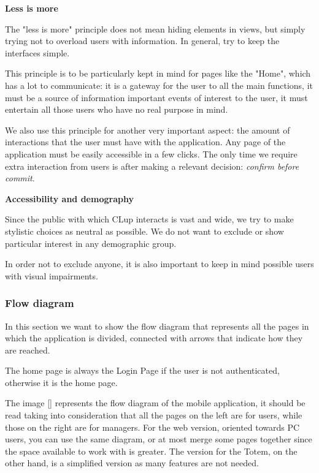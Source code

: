 \noindent
\textbf{Less is more}

The "less is more" principle does not mean hiding elements in views, but simply trying not to overload users with information. In general, try to keep the interfaces simple.

This principle is to be particularly kept in mind for pages like the "Home", which has a lot to communicate: it is a gateway for the user to all the main functions, it must be a source of information important events of interest to the user, it must entertain all those users who have no real purpose in mind.

We also use this principle for another very important aspect: the amount of interactions that the user must have with the application. Any page of the application must be easily accessible in a few clicks. The only time we require extra interaction from users is after making a relevant decision: \textit{confirm before commit}.

\noindent
\textbf{Accessibility and demography}

Since the public with which CLup interacts is vast and wide, we try to make stylistic choices as neutral as possible. We do not want to exclude or show particular interest in any demographic group.

In order not to exclude anyone, it is also important to keep in mind possible users with visual impairments.

\subsubsection{Flow diagram}
\label{subsubsect:flowdiagram}

In this section we want to show the flow diagram that represents all the pages in which the application is divided, connected with arrows that indicate how they are reached.

The home page is always the Login Page if the user is not authenticated, otherwise it is the home page.

The image [] represents the flow diagram of the mobile application, it should be read taking into consideration that all the pages on the left are for users, while those on the right are for managers. For the web version, oriented towards PC users, you can use the same diagram, or at most merge some pages together since the space available to work with is greater. The version for the Totem, on the other hand, is a simplified version as many features are not needed.

